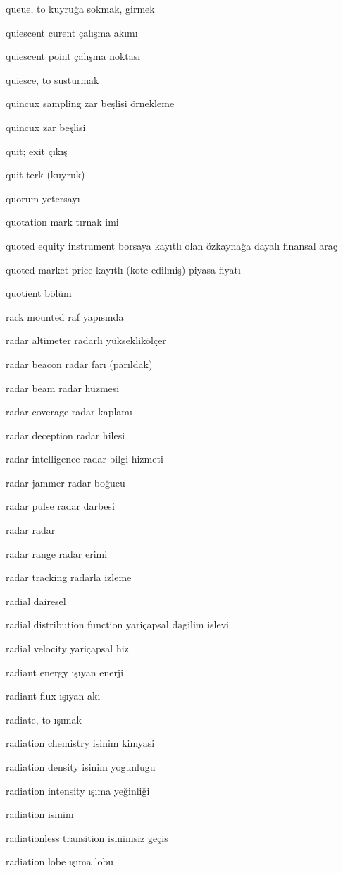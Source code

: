 \documentclass[12pt,fleqn]{article}\usepackage{../../common}
\begin{document}
queue, to kuyruğa sokmak, girmek

quiescent curent çalışma akımı

quiescent point çalışma noktası

quiesce, to susturmak

quincux sampling zar beşlisi örnekleme

quincux zar beşlisi

quit; exit çıkış

quit terk (kuyruk)

quorum yetersayı

quotation mark tırnak imi

quoted equity instrument borsaya kayıtlı olan özkaynağa dayalı finansal araç

quoted market price kayıtlı (kote edilmiş) piyasa fiyatı

quotient bölüm

rack mounted raf yapısında

radar altimeter radarlı yükseklikölçer

radar beacon radar farı (parıldak)

radar beam radar hüzmesi

radar coverage radar kaplamı

radar deception radar hilesi

radar intelligence radar bilgi hizmeti

radar jammer radar boğucu

radar pulse radar darbesi

radar radar

radar range radar erimi

radar tracking radarla izleme

radial dairesel

radial distribution function yariçapsal dagilim islevi

radial velocity yariçapsal hiz

radiant energy ışıyan enerji

radiant flux ışıyan akı

radiate, to ışımak

radiation chemistry isinim kimyasi

radiation density isinim yogunlugu

radiation intensity ışıma yeğinliği

radiation isinim

radiationless transition isinimsiz geçis

radiation lobe ışıma lobu
\end{document}
